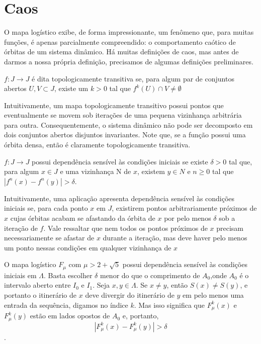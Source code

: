 \documentclass[../IC.tex]{subfiles}
\begin{document}
	\chapter{Caos}
	
	O mapa logístico exibe, de forma impressionante, um fenômeno que, para muitas funções, é apenas parcialmente compreendido: o comportamento caótico de órbitas de um sistema dinâmico. Há muitas definições de caos, mas antes de darmos a nossa própria definição, precisamos de algumas definições preliminares.
	
	\begin{definicao}
		$f:J\rightarrow J$ é dita topologicamente transitiva se, para algum par de conjuntos abertos $U, V \subset J$, existe um $k>0$ tal que $f^k(U) \cap V \neq \emptyset$
	\end{definicao}
	
	Intuitivamente, um mapa topologicamente transitivo possui pontos que eventualmente se movem sob iterações de uma pequena vizinhança arbitrária para outra. Consequentemente, o sistema dinâmico não pode ser decomposto em dois conjuntos abertos disjuntos invariantes. Note que, se a função possui uma órbita densa, então é claramente topologicamente transitiva.
	
	\begin{definicao}
		$f: J \rightarrow J$ possui dependência sensível às condições iniciais se existe $\delta > 0$ tal que, para algum $x\in J$ e uma vizinhança N de $x$, existem $y \in N$ e $n\geq 0$ tal que $|f^n(x)-f^n(y)| > \delta$.
	\end{definicao}
	
	Intuitivamente, uma aplicação apresenta dependência sensível às condições iniciais se, para cada ponto $x$ em $J$, existirem pontos arbitrariamente próximos de $x$ cujas órbitas acabam se afastando da órbita de $x$ por pelo menos $\delta$ sob a iteração de $f$. Vale ressaltar que nem todos os pontos próximos de $x$ precisam necessariamente se afastar de $x$ durante a iteração, mas deve haver pelo menos um ponto nessas condições em qualquer vizinhança de $x$
	
	\begin{exemplo}\label{mapaLogisticoSensivel}
		O mapa logístico $F_\mu$ com $\mu>2+\sqrt{5}$ possui dependência sensível às condições iniciais em $\Lambda$. Basta escolher $\delta$ menor do que o comprimento de $A_0$,onde $A_0$ é o intervalo aberto entre $I_0$ e $I_1$. Seja $x,y \in \Lambda$. Se $x \neq y$, então $S(x) \neq S(y)$, e portanto o itinerário de $x$ deve divergir do itinerário de $y$ em pelo menos uma entrada da sequência, digamos no índice $k$. Mas isso significa que $F_\mu^k(x)$ e $F_\mu^k(y)$ estão em lados opostos de $A_0$ e, portanto,
		$$|F_\mu^k(x)-F_\mu^k(y)| > \delta$$.
	\end{exemplo}
	
\end{document}

